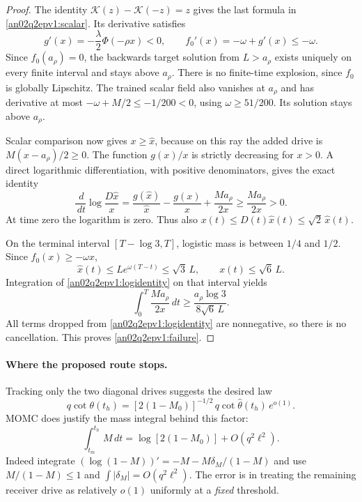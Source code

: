 \documentclass[11pt]{article}
\theoremstyle{remark}\newtheorem{remark}[theorem]{Remark}
\newcommand{\dd}{\,d}
\begin{document}
\begin{proof}
The identity $\mathcal K(z)-\mathcal K(-z)=z$ gives the last
formula in \eqref{an02q2epv1:scalar}. Its derivative satisfies
\[
 g'(x)=-\frac{\lambda}{2}\Phi(-\rho x)<0,\qquad
 f_0'(x)=-\omega+g'(x)\le-\omega .
\]
Since $f_0(a_\rho)=0$, the backwards target solution from $L>a_\rho$
exists uniquely on every finite interval and stays above $a_\rho$.
There is no finite-time explosion, since $f_0$ is globally Lipschitz.
The trained scalar field also vanishes at $a_\rho$ and has derivative
at most $-\omega+M/2\le-1/200<0$, using $\omega\ge51/200$.
Its solution stays above $a_\rho$.

Scalar comparison now gives $x\ge\widehat x$, because on this ray
the added drive is $M(x-a_\rho)/2\ge0$.
The function $g(x)/x$ is strictly decreasing for $x>0$.
A direct logarithmic differentiation, with positive denominators,
gives the exact identity
\begin{equation}
 \frac{\dd}{\dd t}\log\frac{D\widehat x}{x}
 =\frac{g(\widehat x)}{\widehat x}-\frac{g(x)}x
       +\frac{Ma_\rho}{2x}
 \ge\frac{Ma_\rho}{2x}>0 .
 \label{an02q2epv1:logidentity}
\end{equation}
At time zero the logarithm is zero. Thus also
$x(t)\le D(t)\widehat x(t)\le\sqrt2\,\widehat x(t)$.

On the terminal interval $[T-\log3,T]$, logistic mass is
between $1/4$ and $1/2$. Since $f_0(x)\ge-\omega x$,
\[
 \widehat x(t)\le L e^{\omega(T-t)}\le\sqrt3\,L,\qquad
 x(t)\le\sqrt6\,L .
\]
Integration of \eqref{an02q2epv1:logidentity} on that interval yields
\begin{equation}
 \int_0^T\frac{Ma_\rho}{2x}\dd t
 \ge\frac{a_\rho\log3}{8\sqrt6\,L}.
 \label{an02q2epv1:missingbudget}
\end{equation}
All terms dropped from \eqref{an02q2epv1:logidentity} are
nonnegative, so there is no cancellation. This proves
\eqref{an02q2epv1:failure}.
\end{proof}

\paragraph{Where the proposed route stops.}
Tracking only the two diagonal drives suggests the desired law
\begin{equation}
 q\cot\theta(t_h)=
 [2(1-M_0)]^{-1/2}\,
 q\cot\widehat\theta(t_h)\,e^{o(1)} .
 \label{an02q2epv1:requested}
\end{equation}
MOMC does justify the mass integral behind this factor:
\[
 \int_{t_m}^{t_h}M\dd t=
 \log[2(1-M_0)]+O(q^2\ell^2).
\]
Indeed integrate
$(\log(1-M))'=-M-M\delta_M/(1-M)$ and use
$M/(1-M)\le1$ and $\int|\delta_M|=O(q^2\ell^2)$.
The error is in treating the remaining receiver drive as relatively
$o(1)$ uniformly at a \emph{fixed} threshold.
\end{document}
